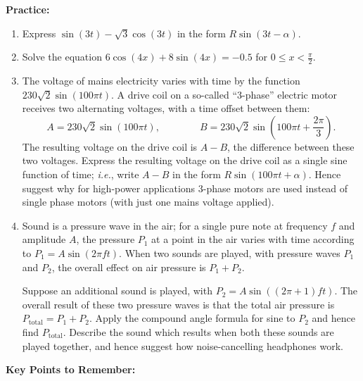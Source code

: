 \documentclass{article}
\begin{document}
\clearpage






\textbf{Practice:}

\vspace{5mm}


\begin{enumerate}
\item Express $\sin(3t)-\sqrt{3}\cos(3t)$ in the form $R\sin(3t-\alpha)$.
\item Solve the equation $6\cos(4x)+8\sin(4x) = -0.5$ for $0\leq x<\frac{\pi}{2}$.
\item The voltage of mains electricity varies with time by the function $230\sqrt{2}\sin(100\pi t)$. A drive coil on a so-called ``3-phase'' electric motor receives two alternating voltages, with a time offset between them:
\[A=230\sqrt{2}\sin(100\pi t),\qquad\qquad B=230\sqrt{2}\sin\left(100\pi t+\frac{2\pi}{3}\right).\]
The resulting voltage on the drive coil is $A-B$, the difference between these two voltages. Express the resulting voltage on the drive coil as a single sine function of time; \textit{i.e.}, write $A-B$ in the form $R\sin(100\pi t+\alpha)$. Hence suggest why for high-power applications 3-phase motors are used instead of single phase motors (with just one mains voltage applied).
\item Sound is a pressure wave in the air; for a single pure note at frequency $f$ and amplitude $A$, the pressure $P_1$ at a point in the air varies with time according to $P_1=A\sin(2\pi f t)$. When two sounds are played, with pressure waves $P_1$ and $P_2$, the overall effect on air pressure is $P_1+P_2$.

Suppose an additional sound is played, with $P_2=A\sin\left((2\pi+1) ft\right)$. The overall result of these two pressure waves is that the total air pressure is $P_{\mathrm{total}}=P_1+P_2$. Apply the compound angle formula for sine to $P_2$ and hence find $P_\mathrm{total}$. Describe the sound which results when both these sounds are played together, and hence suggest how noise-cancelling headphones work.
\end{enumerate}



\clearpage


\textbf{Key Points to Remember:}
\end{document}
